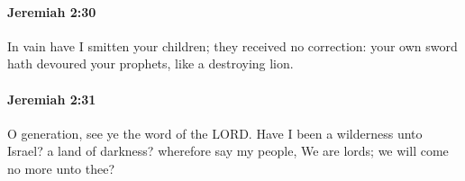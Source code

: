 		\paragraph{Jeremiah 2:30} %
			\label{JEREMIAH-2-30}

			In vain have I smitten your children; they received no correction: your own sword hath devoured your prophets, like a destroying lion.


		\paragraph{Jeremiah 2:31} %
			\label{JEREMIAH-2-31}

			O generation, see ye the word of the LORD. Have I been a wilderness unto Israel? a land of darkness? wherefore say my people, We are lords; we will come no more unto thee?


